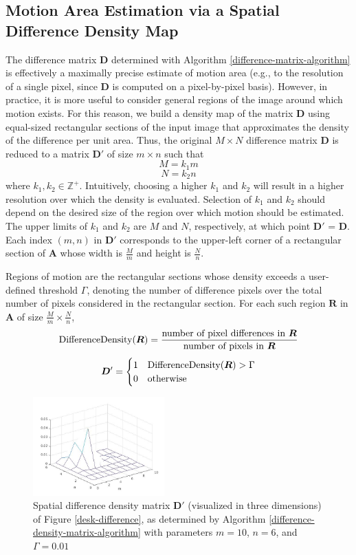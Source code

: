 \documentclass[journal]{IEEEtran}
\begin{document}
\subsection{Motion Area Estimation via a Spatial Difference Density Map}
The difference matrix $\boldsymbol{D}$ determined with Algorithm \ref{difference-matrix-algorithm} is effectively a maximally precise estimate of motion area (e.g., to the resolution of a single pixel, since $\boldsymbol{D}$ is computed on a pixel-by-pixel basis). However, in practice, it is more useful to consider general regions of the image around which motion exists. For this reason, we build a density map of the matrix $\boldsymbol{D}$ using equal-sized rectangular sections of the input image that approximates the density of the difference per unit area. Thus, the original $M \times N$ difference matrix $\boldsymbol{D}$ is reduced to a matrix $\boldsymbol{D}'$ of size $m \times n$ such that
$$M = k_1 m$$
$$N = k_2 n$$
where $k_1, k_2 \in \mathbb{Z}^+$. Intuitively, choosing a higher $k_1$ and $k_2$ will result in a higher resolution over which the density is evaluated. Selection of $k_1$ and $k_2$ should depend on the desired size of the region over which motion should be estimated. The upper limits of $k_1$ and $k_2$ are $M$ and $N$, respectively, at which point $\boldsymbol{D}'$ = $\boldsymbol{D}$. Each index $(m, n)$ in $\boldsymbol{D}'$ corresponds to the upper-left corner of a rectangular section of $\boldsymbol{A}$ whose width is $\frac{M}{m}$ and height is $\frac{N}{n}$.
\par Regions of motion are the rectangular sections whose density exceeds a user-defined threshold $\Gamma$, denoting the number of difference pixels over the total number of pixels considered in the rectangular section. For each such region $\boldsymbol{R}$ in $\boldsymbol{A}$ of size $\frac{M}{m} \times \frac{N}{n}$,
$$\textnormal{DifferenceDensity}(\boldsymbol{R}) = \frac{\textnormal{number of pixel differences in } \boldsymbol{R}}{\textnormal{number of pixels in } \boldsymbol{R}}$$
\[
\boldsymbol{D}' =
\begin{cases}
1 & \textnormal{DifferenceDensity}(\boldsymbol{R}) > \Gamma\\
0 & \textnormal{otherwise}
\end{cases}
\]
\begin{figure}[]
	\centering
	\includegraphics[width=0.45\textwidth]{desk_difference_density.jpg}
	\caption{Spatial difference density matrix $\boldsymbol{D}'$ (visualized in three dimensions) of Figure \ref{desk-difference}, as determined by Algorithm \ref{difference-density-matrix-algorithm} with parameters $m = 10$, $n = 6$, and $\Gamma = 0.01$}
    \label{desk-difference-density}
\end{figure}
\end{document}
